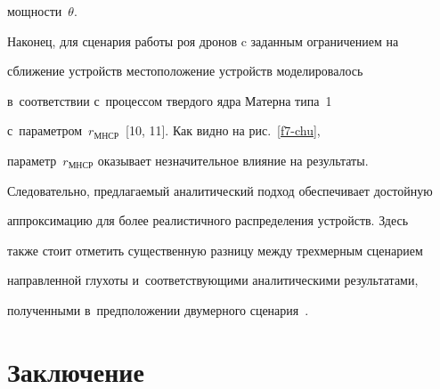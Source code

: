 мощности~$\theta$.


  


  Наконец, для сценария работы роя дронов c заданным ограничением на 


сближение устройств местоположение устройств моделировалось 


в~соответствии с~процессом твердого ядра Матерна типа~1 


с~параметром~$r_{МНСР}$~[10, 11]. Как видно на рис.~\ref{f7-chu}, 


параметр~$r_{МНСР}$ оказывает незначительное влияние на результаты. 


Следовательно, предлагаемый аналитический подход обеспечивает достойную 


аппроксимацию для более реалистичного распределения устройств. Здесь 


также стоит отметить существенную разницу между трехмерным сценарием 


направленной глухоты и~соответствующими аналитическими результатами, 


полученными в~предположении двумерного сценария~\cite{5-chu}.


  





\section{Заключение}





\vspace*{-6pt}





